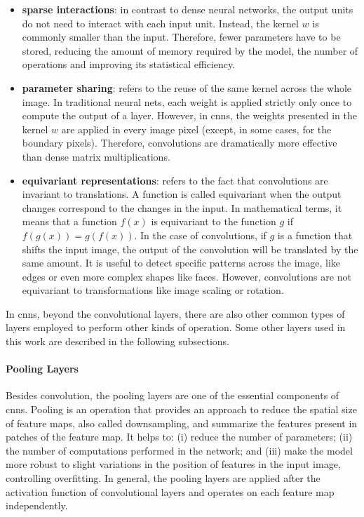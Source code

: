 \begin{itemize}
\item \textbf{sparse interactions}: in contrast to dense neural networks, the output units do not need to interact with each input unit. Instead, the kernel $w$ is commonly smaller than the input. Therefore, fewer parameters have to be stored, reducing the amount of memory required by the model, the number of operations and improving its statistical efficiency.

\item \textbf{parameter sharing}: refers to the reuse of the same kernel across the whole image. In traditional neural nets, each weight is applied strictly only once to compute the output of a layer. However, in \acsp{cnn}, the weights presented in the kernel $w$ are applied in every image pixel (except, in some cases, for the boundary pixels). Therefore, convolutions are dramatically more effective than dense matrix multiplications.

\item \textbf{equivariant representations}: refers to the fact that convolutions are invariant to translations. A function is called equivariant when the output changes correspond to the changes in the input. In mathematical terms, it means that a function $f(x)$ is equivariant to the function $g$ if $f(g(x)) = g(f(x))$. In the case of convolutions, if $g$ is a function that shifts the input image, the output of the convolution will be translated by the same amount. It is useful to detect specific patterns across the image, like edges or even more complex shapes like faces. However, convolutions are not equivariant to transformations like image scaling or rotation.
\end{itemize}

In \aclp{cnn}, beyond the convolutional layers, there are also other common types of layers employed to perform other kinds of operation. Some other layers used in this work are described in the following subsections.

\paragraph{Pooling Layers}

Besides convolution, the pooling layers are one of the essential components of \aclp{cnn}. Pooling is an operation that provides an approach to reduce the spatial size of feature maps, also called downsampling, and summarize the features present in patches of the feature map. It helps to: (i) reduce the number of parameters; (ii) the number of computations performed in the network; and (iii) make the model more robust to slight variations in the position of features in the input image, controlling overfitting. In general, the pooling layers are applied after the activation function of convolutional layers and operates on each feature map independently.

